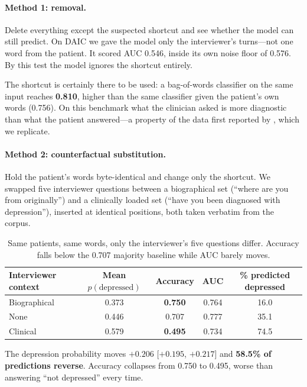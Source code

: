 \documentclass{article}
\begin{document}
\paragraph{Method 1: removal.} Delete everything except the suspected shortcut
and see whether the model can still predict. On DAIC we gave the model only the
interviewer's turns---not one word from the patient. It scored AUC 0.546, inside
its own noise floor of 0.576. By this test the model ignores the shortcut
entirely.

The shortcut is certainly there to be used: a bag-of-words classifier on the same
input reaches \textbf{0.810}, higher than the same classifier given the
patient's own words (0.756). On this benchmark what the clinician asked is more
diagnostic than what the patient answered---a property of the data first
reported by \citet{burdisso2024daicwoz}, which we replicate.

\paragraph{Method 2: counterfactual substitution.} Hold the patient's words
byte-identical and change only the shortcut. We swapped five interviewer
questions between a biographical set (``where are you from originally'') and a
clinically loaded set (``have you been diagnosed with depression''), inserted at
identical positions, both taken verbatim from the corpus.

\begin{table}[t]
\centering
\caption{Same patients, same words, only the interviewer's five questions differ.
Accuracy falls below the 0.707 majority baseline while AUC barely moves.}
\label{tab:arms}
\begin{tabular}{lcccc}
\toprule
Interviewer context & Mean $p(\text{depressed})$ & Accuracy & AUC & \% predicted depressed \\
\midrule
Biographical  & 0.373 & \textbf{0.750} & 0.764 & 16.0 \\
None          & 0.446 & 0.707 & 0.777 & 35.1 \\
Clinical      & 0.579 & \textbf{0.495} & 0.734 & 74.5 \\
\bottomrule
\end{tabular}
\end{table}

The depression probability moves $+0.206$ [$+0.195$, $+0.217$] and
\textbf{58.5\% of predictions reverse}. Accuracy collapses from 0.750 to 0.495,
worse than answering ``not depressed'' every time.
\end{document}
